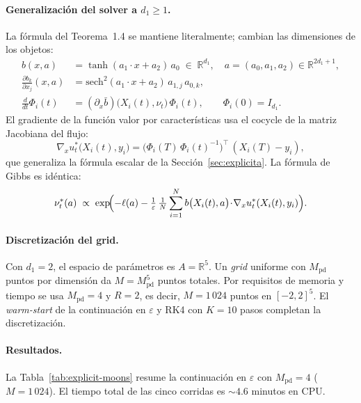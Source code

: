 \documentclass[11pt, a4paper]{article}
\theoremstyle{definition}
\newcommand{\eps}{\varepsilon}
\begin{document}
\paragraph{Generalización del solver a $d_1\ge 1$.}
La fórmula del Teorema~1.4 se mantiene literalmente; cambian las
dimensiones de los objetos:
\begin{align*}
  b(x,a) &= \tanh(a_1\!\cdot\! x + a_2)\,a_0
  \;\in\;\mathbb R^{d_1},\quad a=(a_0,a_1,a_2)\in\mathbb R^{2d_1+1},\\
  \tfrac{\partial b_k}{\partial x_j}(x,a) &=
  \mathrm{sech}^2(a_1\!\cdot\! x + a_2)\,a_{1,j}\,a_{0,k},\\
  \tfrac{d}{dt} \Phi_i(t) &= (\partial_x \bar b)\bigl(X_i(t),\nu_t\bigr)\,\Phi_i(t),
  \qquad \Phi_i(0) = I_{d_1}.
\end{align*}
El gradiente de la función valor por características usa el cocycle
de la matriz Jacobiana del flujo:
\[
  \nabla_x u_t^*\bigl(X_i(t), y_i\bigr) =
  \bigl(\Phi_i(T)\,\Phi_i(t)^{-1}\bigr)^{\!\top}\,(X_i(T) - y_i),
\]
que generaliza la fórmula escalar de la Sección~\ref{sec:explicita}.
La fórmula de Gibbs es idéntica:
\[
  \nu_t^*(a) \;\propto\;
  \exp\!\Bigl(-\ell(a) -
    \tfrac1\eps\,\tfrac1N\sum_{i=1}^N
    b\bigl(X_i(t),a\bigr)\!\cdot\!\nabla_x u_t^*(X_i(t),y_i)\Bigr).
\]

\paragraph{Discretización del grid.}
Con $d_1=2$, el espacio de parámetros es $A=\mathbb R^5$. Un
\emph{grid} uniforme con $M_{\mathrm{pd}}$ puntos por dimensión da
$M=M_{\mathrm{pd}}^5$ puntos totales. Por requisitos de memoria y
tiempo se usa $M_{\mathrm{pd}}=4$ y $R=2$, es decir, $M=1\,024$
puntos en $[-2,2]^5$. El \emph{warm-start} de la continuación en
$\eps$ y RK4 con $K=10$ pasos completan la discretización.

\paragraph{Resultados.}
La Tabla~\ref{tab:explicit-moons} resume la continuación en
$\eps$ con $M_{\mathrm{pd}}=4$ ($M=1\,024$). El tiempo total de
las cinco corridas es $\sim 4.6$ minutos en CPU.
\end{document}
